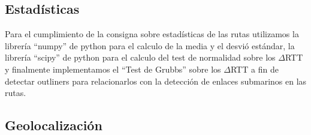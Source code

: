 \subsection{Estadísticas}

Para el cumplimiento de la consigna sobre estadísticas de las rutas utilizamos la librería ``numpy'' de python para el calculo de la media y el desvió estándar, la librería ``scipy'' de python para el calculo del test de normalidad sobre los $\Delta$RTT y finalmente implementamos el ``Test de Grubbs'' sobre los $\Delta$RTT a fin de detectar outliners para relacionarlos con la detección de enlaces submarinos en las rutas.

\subsection{Geolocalización}
